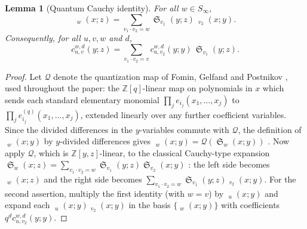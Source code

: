\documentclass{amsart}
\newtheorem{lemma}{Lemma}[section]
\theoremstyle{definition}
\theoremstyle{remark}
\numberwithin{equation}{section}
\DeclareMathOperator{\sch}{\mathfrak{S}}
\DeclareMathOperator{\qsch}{\widetilde{\mathfrak{S}}}
\begin{document}
\begin{lemma}[Quantum Cauchy identity] \label{lemma:quantumtoordinary}
For all $w\in S_\infty$,
$$\qsch_w(x;z)=\sum_{v_1\cdot v_2=w}\sch_{v_1}(y;z)\,\qsch_{v_2}(x;y).$$
Consequently, for all $u,v,w$ and $d$,
$$c_{u,v}^{w,d}(y;z)=\sum_{v_1\cdot v_2=v}c_{u,v_2}^{w,d}(y;y)\,\sch_{v_1}(y;z).$$
\end{lemma}
\begin{proof}
Let $\mathcal Q$ denote the quantization map of Fomin, Gelfand and Postnikov \cite{fomin1997quantum}, used throughout the paper: the $\mathbb Z[q]$-linear map on polynomials in $x$ which sends each standard elementary monomial $\prod_j e_{i_j}(x_1,\ldots,x_j)$ to $\prod_j e^{(q)}_{i_j}(x_1,\ldots,x_j)$, extended linearly over any further coefficient variables. Since the divided differences in the $y$-variables commute with $\mathcal Q$, the definition of $\qsch_w(x;y)$ by $y$-divided differences gives $\qsch_w(x;y)=\mathcal Q(\sch_w(x;y))$ \cite[(10)]{lam2014quantum}. Now apply $\mathcal Q$, which is $\mathbb Z[y,z]$-linear, to the classical Cauchy-type expansion $\sch_w(x;z)=\sum_{v_1\cdot v_2=w}\sch_{v_1}(y;z)\sch_{v_2}(x;y)$ \cite[(6.3)]{notes}: the left side becomes $\qsch_w(x;z)$ and the right side becomes $\sum_{v_1\cdot v_2=w}\sch_{v_1}(y;z)\qsch_{v_2}(x;y)$. For the second assertion, multiply the first identity (with $w=v$) by $\qsch_u(x;y)$ and expand each $\qsch_u(x;y)\qsch_{v_2}(x;y)$ in the basis $\{\qsch_w(x;y)\}$ with coefficients $q^dc_{u,v_2}^{w,d}(y;y)$.
\end{proof}
\end{document}
